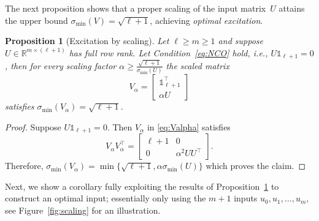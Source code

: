 \documentclass[a4paper, reqno]{amsart}
\newcommand{\R}{\ensuremath{\mathbb R}}
\newcommand{\dd}{\ell}
\newcommand{\one}{\mathds{1}}
\newtheorem{proposition}[theorem]{Proposition}
\begin{document}
The next proposition shows that a proper scaling of the input matrix~$U$ attains the upper bound $\sigma_\mathrm{min}(V) = \sqrt{\dd+1}$, achieving \textit{optimal excitation}. 
\begin{proposition}[Excitation by scaling]\label{prop:SCO}
    Let $\dd \geq m \geq 1$ and suppose $U\in \R^{m\times (\dd+1)}$ has full row rank. Let Condition~\eqref{eq:NCO} hold, i.e., $U \one_{\dd+1}=0$, then for every scaling factor $\alpha \geq \frac{\sqrt{\dd+1}}{\sigma_\mathrm{min}(U)}$ the scaled matrix
    \begin{equation}\label{eq:Valpha}
        V_\alpha = \begin{bmatrix}
            \one_{\dd+1}^\top\\ \alpha U
        \end{bmatrix}
    \end{equation}
    satisfies $\sigma_\mathrm{min}(V_\alpha)=\sqrt{\dd+1}$.
\end{proposition}
\begin{proof}
    Suppose $U\one_{\dd+1}=0$. Then $V_\alpha$ in \eqref{eq:Valpha} satisfies
    \begin{equation}
        V_\alpha V_\alpha^\top = \begin{bmatrix}
            \dd+1 & 0\\
            0 & \alpha^2 UU^\top
        \end{bmatrix}.
    \end{equation}
    Therefore, $\sigma_\mathrm{min}(V_\alpha) = \min\{\sqrt{\dd+1}, \alpha\sigma_\mathrm{min}(U)\}$ which proves the claim.
\end{proof}
Next, we show a corollary fully exploiting the results of Proposition~\ref{prop:SCO} to construct an optimal input; essentially only using the $m+1$ inputs $u_0,u_1,\ldots,u_m$, see Figure~\ref{fig:scaling} for an illustration.
\end{document}
